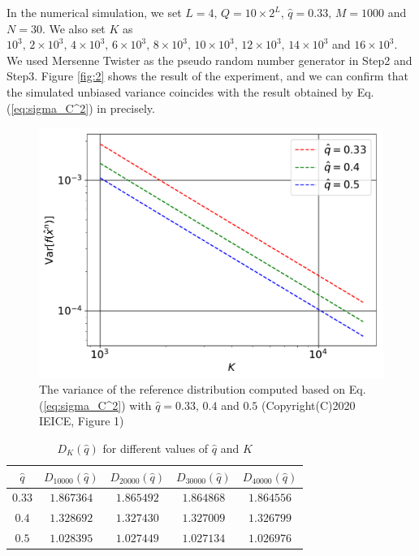 \documentclass[dvipdfmx,english]{ampmt} %
\begin{document}
%
In the numerical simulation, we set $L=4,\,Q=10\times 2^L,\,\hat{q}=0.33,\, M=1000$ and $N=30$. We also set $K$ as $10^3,\,2\times 10^3 ,\, 4\times 10^3,\, 6\times 10^3,\, 8\times 10^3,\, 10\times 10^3,\,12\times 10^3,\,14\times 10^3$ and $16 \times 10^3$. We used Mersenne Twister as the pseudo random number generator in Step2 and Step3.
Figure \ref{fig:2} shows the result of the experiment, and we can confirm that the simulated unbiased variance coincides with the result obtained by Eq. (\ref{eq:sigma_C^2}) in precisely.
%
\begin{figure}[htbp]
  \centering
    \includegraphics[width=0.8\linewidth]{./figure/fig3.pdf}
    \caption{The variance of the reference distribution computed based on Eq. (\ref{eq:sigma_C^2}) with $\hat{q}=0.33,\, 0.4$ and $0.5$ (Copyright(C)2020 IEICE, \cite{hikima2020} Figure 1)}
    \label{fig:1}
\end{figure}
%
\begin{table}[htbp]
  \centering
  \caption{$D_K(\hat{q})$ for different values of $\hat{q}$ and $K$}
  \begin{tabular}{ccccc} \hline
    $\hat{q}$ & $D_{10000}(\hat{q})$ & $D_{20000}(\hat{q})$ & $D_{30000}(\hat{q})$ & $D_{40000}(\hat{q})$  \\ \hline 
    $0.33$    & $1.867364$     & $1.865492$     & $1.864868$     & $1.864556$\\
    $0.4$     & $1.328692$     & $1.327430$     & $1.327009$     & $1.326799$\\
    $0.5$     & $1.028395$     & $1.027449$     & $1.027134$     & $1.026976$\\ \hline
  \end{tabular}
  \label{tab:1}
\end{table}
%
\end{document}
